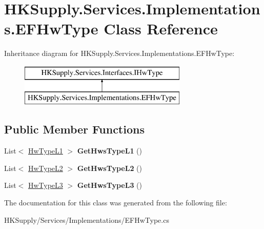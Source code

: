 \hypertarget{class_h_k_supply_1_1_services_1_1_implementations_1_1_e_f_hw_type}{}\section{H\+K\+Supply.\+Services.\+Implementations.\+E\+F\+Hw\+Type Class Reference}
\label{class_h_k_supply_1_1_services_1_1_implementations_1_1_e_f_hw_type}
Inheritance diagram for H\+K\+Supply.\+Services.\+Implementations.\+E\+F\+Hw\+Type\+:\begin{figure}[H]
\begin{center}
\leavevmode
\includegraphics[height=2.000000cm]{class_h_k_supply_1_1_services_1_1_implementations_1_1_e_f_hw_type}
\end{center}
\end{figure}
\subsection*{Public Member Functions}
\begin{DoxyCompactItemize}
\item 
\mbox{\label{class_h_k_supply_1_1_services_1_1_implementations_1_1_e_f_hw_type_a684629eaef0472b06f3fbdc6c592ca6f}} 
List$<$ \mbox{\hyperlink{class_h_k_supply_1_1_models_1_1_hw_type_l1}{Hw\+Type\+L1}} $>$ {\bfseries Get\+Hws\+Type\+L1} ()
\item 
\mbox{\label{class_h_k_supply_1_1_services_1_1_implementations_1_1_e_f_hw_type_adc178a2459f96725b1c086ba3b81c070}} 
List$<$ \mbox{\hyperlink{class_h_k_supply_1_1_models_1_1_hw_type_l2}{Hw\+Type\+L2}} $>$ {\bfseries Get\+Hws\+Type\+L2} ()
\item 
\mbox{\label{class_h_k_supply_1_1_services_1_1_implementations_1_1_e_f_hw_type_a7edde3e8dc05aa70ae5c0d95e06d4c04}} 
List$<$ \mbox{\hyperlink{class_h_k_supply_1_1_models_1_1_hw_type_l3}{Hw\+Type\+L3}} $>$ {\bfseries Get\+Hws\+Type\+L3} ()
\end{DoxyCompactItemize}


The documentation for this class was generated from the following file\+:\begin{DoxyCompactItemize}
\item 
H\+K\+Supply/\+Services/\+Implementations/E\+F\+Hw\+Type.\+cs\end{DoxyCompactItemize}

